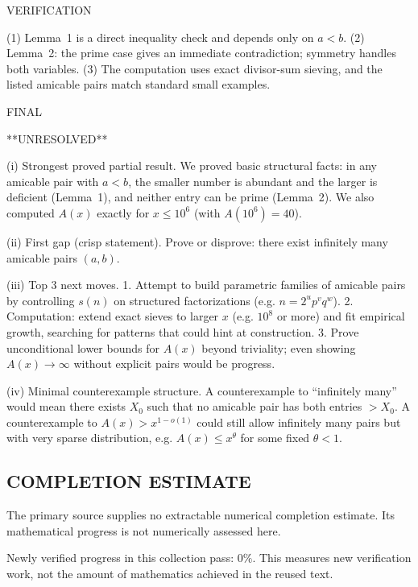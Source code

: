 VERIFICATION

(1) Lemma~1 is a direct inequality check and depends only on $a<b$.
(2) Lemma~2: the prime case gives an immediate contradiction; symmetry handles both variables.
(3) The computation uses exact divisor-sum sieving, and the listed amicable pairs match standard small examples.

FINAL

**UNRESOLVED**

(i) Strongest proved partial result.
We proved basic structural facts: in any amicable pair with $a<b$, the smaller number is abundant and the larger is deficient (Lemma~1), and neither entry can be prime (Lemma~2).
We also computed $A(x)$ exactly for $x\le 10^6$ (with $A(10^6)=40$).

(ii) First gap (crisp statement).
Prove or disprove: there exist infinitely many amicable pairs $(a,b)$.

(iii) Top 3 next moves.
1. Attempt to build parametric families of amicable pairs by controlling $s(n)$ on structured factorizations (e.g. $n=2^u p^v q^w$).
2. Computation: extend exact sieves to larger $x$ (e.g. $10^8$ or more) and fit empirical growth, searching for patterns that could hint at construction.
3. Prove unconditional lower bounds for $A(x)$ beyond triviality; even showing $A(x)\to\infty$ without explicit pairs would be progress.

(iv) Minimal counterexample structure.
A counterexample to “infinitely many” would mean there exists $X_0$ such that no amicable pair has both entries $>X_0$.
A counterexample to $A(x)>x^{1-o(1)}$ could still allow infinitely many pairs but with very sparse distribution, e.g. $A(x)\le x^{\theta}$ for some fixed $\theta<1$.



\subsection*{COMPLETION ESTIMATE}
The primary source supplies no extractable numerical completion estimate. Its mathematical progress is not numerically assessed here.

Newly verified progress in this collection pass: $0\%$. This measures new verification work, not the amount of mathematics achieved in the reused text.
